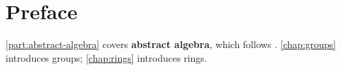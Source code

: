 \frontmatter
\begin{comment}
\section*{About the Author}
\textbf{Ryan Joo Rui An} is a high school student who has just completed his A-Level studies in Singapore. He has spent over 11 years honing his skills in various mathematics competitions. His journey began at an early age, where he developed a fascination with numbers while doing mental arithmetic. This early interest quickly blossomed into a deep commitment to mathematics, leading him to participate in numerous mathematics olympiads competitions.

The author's (not many) mathematics credentials include:
\begin{itemize}
\item 3 Silver awards in the \emph{Singapore Mathematics Olympiad} 2022 to 2024;
\item 6 Gold awards in the \emph{Singapore and Asian Schools Math Olympiad} 2019 to 2023, top in Singapore in 2022 and 2023, top in Malaysia in 2024;
\item Merit award in the \emph{Singapore International Mathematical and Computational Challenge} 2024;
\item 2 Prize awards, 2 High Distinction awards in the \emph{Australian Mathematics Competition} 2019 to 2023, best in school in 2023;
\item Honourable mention in the \emph{High School Mathematical Contest in Modeling} 2023;
\item 2nd place in the \emph{Hua Lo Geng Secondary School Mathematics Competition} 2019;
\item 1st place in the \emph{Chen Jingrun's Cup Secondary School Mathematics Competition} 2019.
\end{itemize}

Outside of mathematics, the author has a keen interest in playing chess and programming.

This book is a culmination of the author's years of experience, dedication, and love for mathematics while he studies mathematics at the undergraduate level.
\pagebreak
\end{comment}

\section*{Preface}
\ifabsalg
\cref{part:abstract-algebra} covers \textbf{abstract algebra}, which follows \cite{dummit-foote,artin}. \cref{chap:groups} introduces groups; \cref{chap:rings} introduces rings.
\fi

